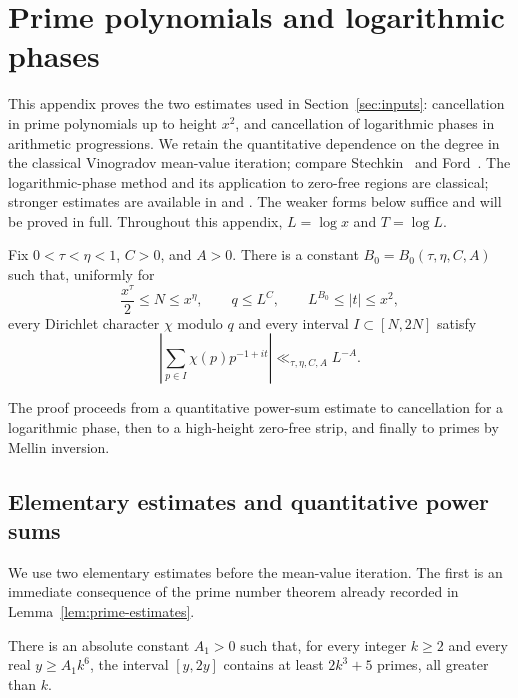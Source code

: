 \section{Prime polynomials and logarithmic phases}\label{lp:section}

This appendix proves the two estimates used in
Section~\ref{sec:inputs}: cancellation in prime polynomials up to height
$x^2$, and cancellation of logarithmic phases in arithmetic progressions.
We retain the quantitative dependence on the degree in the classical
Vinogradov mean-value iteration; compare Stechkin~\cite{Stechkin1975}
and Ford~\cite[discussion preceding Theorem~3]{Ford2002}.
The logarithmic-phase method and its application to zero-free regions
are classical; stronger estimates are available in
\cite[Theorem~2 and Corollary~2A]{Ford2002} and
\cite[Theorem~1.1]{Khale2024}.
The weaker forms below suffice and will be proved in full.
Throughout this appendix, $L=\log x$ and $T=\log L$.

\begin{lemma}\label{lp:prime-polynomial}
Fix $0<\tau<\eta<1$, $C>0$, and $A>0$.  There is a constant
$B_0=B_0(\tau,\eta,C,A)$ such that, uniformly for
\[
 \frac{x^\tau}{2}\le N\le x^\eta,\qquad
 q\le L^C,\qquad L^{B_0}\le |t|\le x^2,
\]
every Dirichlet character $\chi$ modulo $q$ and every interval
$I\subset[N,2N]$ satisfy
\begin{equation}\label{lp:prime-estimate}
 \left|\sum_{p\in I}\chi(p)p^{-1+it}\right|
 \ll_{\tau,\eta,C,A} L^{-A}.
\end{equation}
\end{lemma}

The proof proceeds from a quantitative power-sum estimate to cancellation
for a logarithmic phase, then to a high-height zero-free strip, and finally
to primes by Mellin inversion.

\subsection{Elementary estimates and quantitative power sums}

We use two elementary estimates before the mean-value iteration. The
first is an immediate consequence of the prime number theorem already
recorded in Lemma~\ref{lem:prime-estimates}.

\begin{lemma}\label{lp:pre-primes}
There is an absolute constant $A_1>0$ such that, for every integer
$k\ge2$ and every real $y\ge A_1k^6$, the interval $[y,2y]$
contains at least $2k^3+5$ primes, all greater than $k$.
\end{lemma}

